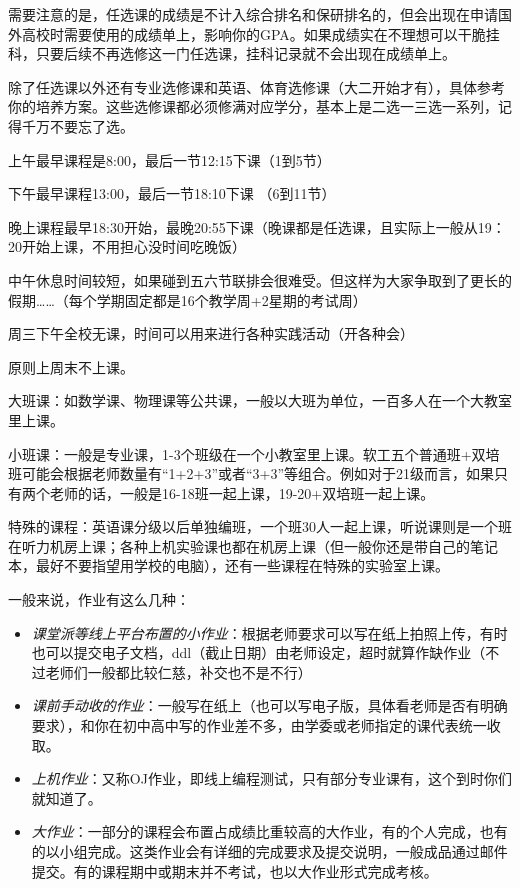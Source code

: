 需要注意的是，任选课的成绩是不计入综合排名和保研排名的，但会出现在申请国外高校时需要使用的成绩单上，影响你的GPA。如果成绩实在不理想可以干脆挂科，只要后续不再选修这一门任选课，挂科记录就不会出现在成绩单上。

除了任选课以外还有专业选修课和英语、体育选修课（大二开始才有），具体参考你的培养方案。这些选修课都必须修满对应学分，基本上是二选一三选一系列，记得千万不要忘了选。


上午最早课程是8:00，最后一节12:15下课（1到5节）

下午最早课程13:00，最后一节18:10下课 （6到11节）

晚上课程最早18:30开始，最晚20:55下课（晚课都是任选课，且实际上一般从19：20开始上课，不用担心没时间吃晚饭）

中午休息时间较短，如果碰到五六节联排会很难受。但这样为大家争取到了更长的假期……（每个学期固定都是16个教学周+2星期的考试周）

周三下午全校无课，时间可以用来进行各种实践活动（开各种会）

原则上周末不上课。


大班课：如数学课、物理课等公共课，一般以大班为单位，一百多人在一个大教室里上课。

小班课：一般是专业课，1-3个班级在一个小教室里上课。软工五个普通班+双培班可能会根据老师数量有“1+2+3”或者“3+3”等组合。例如对于21级而言，如果只有两个老师的话，一般是16-18班一起上课，19-20+双培班一起上课。

特殊的课程：英语课分级以后单独编班，一个班30人一起上课，听说课则是一个班在听力机房上课；各种上机实验课也都在机房上课（但一般你还是带自己的笔记本，最好不要指望用学校的电脑），还有一些课程在特殊的实验室上课。


一般来说，作业有这么几种：

\begin{itemize}
    \item \emph{课堂派等线上平台布置的小作业}：根据老师要求可以写在纸上拍照上传，有时也可以提交电子文档，ddl（截止日期）由老师设定，超时就算作缺作业（不过老师们一般都比较仁慈，补交也不是不行）
    \item \emph{课前手动收的作业}：一般写在纸上（也可以写电子版，具体看老师是否有明确要求），和你在初中高中写的作业差不多，由学委或老师指定的课代表统一收取。
    \item \emph{上机作业}：又称OJ作业，即线上编程测试，只有部分专业课有，这个到时你们就知道了。
    \item \emph{大作业}：一部分的课程会布置占成绩比重较高的大作业，有的个人完成，也有的以小组完成。这类作业会有详细的完成要求及提交说明，一般成品通过邮件提交。有的课程期中或期末并不考试，也以大作业形式完成考核。
\end{itemize}

